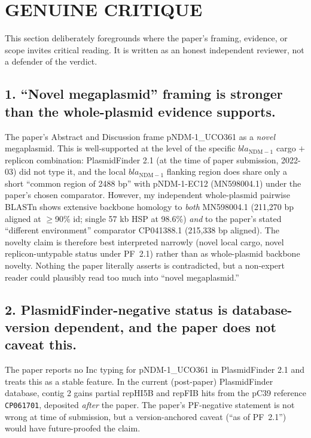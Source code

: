 \documentclass[11pt,letterpaper]{article}
\begin{document}
\section{GENUINE CRITIQUE}
This section deliberately foregrounds where the paper's framing, evidence, or scope invites
critical reading. It is written as an honest independent reviewer, not a defender of the verdict.

\subsection*{1. ``Novel megaplasmid'' framing is stronger than the whole-plasmid evidence supports.}
The paper's Abstract and Discussion frame pNDM-1\_UCO361 as a \emph{novel} megaplasmid. This is
well-supported at the level of the specific $bla_{\mathrm{NDM-1}}$ cargo $+$ replicon combination:
PlasmidFinder 2.1 (at the time of paper submission, 2022-03) did not type it, and the local
$bla_{\mathrm{NDM-1}}$ flanking region does share only a short ``common region of 2488 bp'' with
pNDM-1-EC12 (MN598004.1) under the paper's chosen comparator. However, my independent whole-plasmid
pairwise BLASTn shows extensive backbone homology to \emph{both} MN598004.1 (211{,}270 bp aligned at
$\geq$90\% id; single 57 kb HSP at 98.6\%) \emph{and} to the paper's stated ``different environment''
comparator CP041388.1 (215{,}338 bp aligned). The novelty claim is therefore best interpreted
narrowly (novel local cargo, novel replicon-untypable status under PF~2.1) rather than as
whole-plasmid backbone novelty. Nothing the paper literally asserts is contradicted, but a
non-expert reader could plausibly read too much into ``novel megaplasmid.''

\subsection*{2. PlasmidFinder-negative status is database-version dependent, and the paper does not caveat this.}
The paper reports no Inc typing for pNDM-1\_UCO361 in PlasmidFinder 2.1 and treats this as a
stable feature. In the current (post-paper) PlasmidFinder database, contig 2 gains partial
repHI5B and repFIB hits from the pC39 reference \texttt{CP061701}, deposited \emph{after} the
paper. The paper's PF-negative statement is not wrong at time of submission, but a
version-anchored caveat (``as of PF~2.1'') would have future-proofed the claim.
\end{document}
